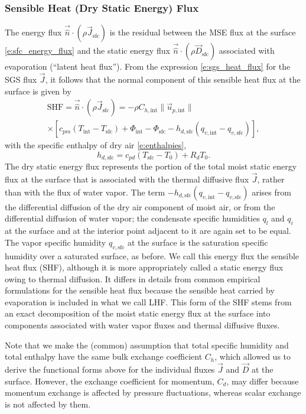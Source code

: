 \documentclass{report}
\begin{document}
\subsubsection{Sensible Heat (Dry Static Energy) Flux} The energy flux $\vec{\hat n} \cdot (\rho \vec{J}_{\mathrm{sfc}})$ is the residual between the MSE flux at the surface \eqref{e:sfc_energy_flux} and the static energy flux $\vec{\hat n} \cdot (\rho \vec{D}_\mathrm{sfc})$ associated with evaporation (``latent heat flux''). From the expression \eqref{e:sgs_heat_flux} for the SGS flux $\vec{J}$, it follows that the normal component of this sensible heat flux at the surface is given by 
\begin{multline}\label{e:sfc_SHF}
    \mathrm{SHF} = \vec{\hat n} \cdot (\rho \vec{J}_{\mathrm{sfc}}) =
    -\rho C_{h, \mathrm{int}} \| \vec{u}_{p, \mathrm{int}} \|
    \\
    \times \left[ c_{pm} \left(T_\mathrm{int} - T_\mathrm{sfc} \right) + \Phi_\mathrm{int} - \Phi_\mathrm{sfc}
    - h_{d,\mathrm{sfc}}  \left( q_{v, \mathrm{int}} - q_{v, \mathrm{sfc}} \right) \right],
\end{multline}
with the specific enthalpy of dry air \eqref{e:enthalpies},
\[
h_{d, \mathrm{sfc}} = c_{pd} (T_\mathrm{sfc} - T_0) + R_d T_0.
\]
The dry static energy flux represents the portion of the total moist static energy flux at the surface that is associated with the thermal diffusive flux $\vec{J}$, rather than with the flux of water vapor. The term $-h_{d,\mathrm{sfc}}  \left( q_{v, \mathrm{int}} - q_{v, \mathrm{sfc}} \right)$ arises from the differential diffusion of the dry air component of moist air, or from the differential diffusion of water vapor; the condensate specific humidities $q_l$ and $q_i$ at the surface and at the interior point adjacent to it are again set to be equal. The vapor specific humidity $q_{v, \mathrm{sfc}}$ at the surface is the saturation specific humidity over a saturated surface, as before. We call this energy flux the sensible heat flux (SHF), although it is more appropriately called a static energy flux owing to thermal diffusion. It differs in details from common empirical formulations for the sensible heat flux because the sensible heat carried by evaporation is included in what we call LHF. This form of the SHF stems from an exact decomposition of the moist static energy flux at the surface into components associated with water vapor fluxes and thermal diffusive fluxes.

Note that we make the (common) assumption that total specific humidity and total enthalpy have the same bulk exchange coefficient $C_h$, which allowed us to derive the functional forms above for the individual fluxes $\vec{J}$ and $\vec{D}$ at the surface.  However, the exchange coefficient for momentum, $C_d$, may differ because momentum exchange is affected by pressure fluctuations, whereas scalar exchange is not affected by them.
\end{document}
